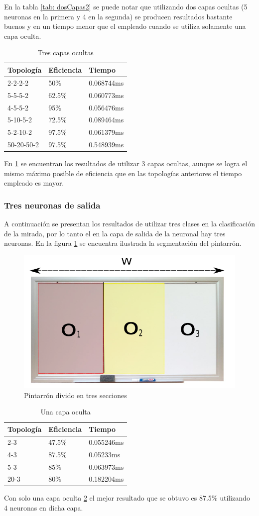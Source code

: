 En la tabla \ref{tab: dosCapas2} se puede notar que utilizando dos capas ocultas (5 neuronas en la primera y 4 en la segunda) se producen resultados bastante buenos y en un tiempo menor que el empleado cuando se utiliza solamente una capa oculta.
\begin{table}[]
	\centering
	\caption{Tres capas ocultas}
	\label{my-label}
	\begin{tabular}{|l|l|l|}
		\hline
		Topología & Eficiencia & Tiempo     \\ \hline
		2-2-2-2   & 50\%       & 0.068744ms \\ \hline
		5-5-5-2   & 62.5\%     & 0.060773ms \\ \hline
		4-5-5-2   & 95\%       & 0.056476ms \\ \hline
		5-10-5-2  & 72.5\%     & 0.089464ms \\ \hline
		5-2-10-2  & 97.5\%     & 0.061379ms \\ \hline
		50-20-50-2  & 97.5\%     & 0.548939ms \\ \hline
	\end{tabular}\label{tab: tresCapas2}
\end{table}
En \ref{tab: tresCapas2} se encuentran los resultados de utilizar 3 capas ocultas, aunque se logra el mismo máximo posible de eficiencia que en las topologías anteriores el tiempo empleado es mayor.

\subsubsection{Tres neuronas de salida}
A continuación se presentan los resultados de utilizar tres clases en la clasificación de la mirada, por lo tanto el en la capa de salida de la neuronal hay tres neuronas. En la figura \ref{fig: pint2} se encuentra ilustrada la segmentación del pintarrón.
\begin{figure}[htbp] 
	\centering
	\includegraphics[width=.3\textwidth]{./pictures/pint2}
	\caption{Pintarrón divido en tres secciones}\label{fig: pint2}
\end{figure}

\begin{table}[]
	\centering
	\caption{Una capa oculta}
	\label{my-label}
	\begin{tabular}{|l|l|l|}
		\hline
		Topología & Eficiencia & Tiempo     \\ \hline
		2-3       & 47.5\%     & 0.055246ms \\ \hline
		4-3       & 87.5\%     & 0.05233ms  \\ \hline
		5-3       & 85\%       & 0.063973ms \\ \hline
		20-3      & 80\%       & 0.182204ms \\ \hline
	\end{tabular}\label{tab:unaCapa3}
\end{table}
Con solo una capa oculta \ref{tab:unaCapa3} el mejor resultado que se obtuvo es 87.5\% utilizando 4 neuronas en dicha capa.

